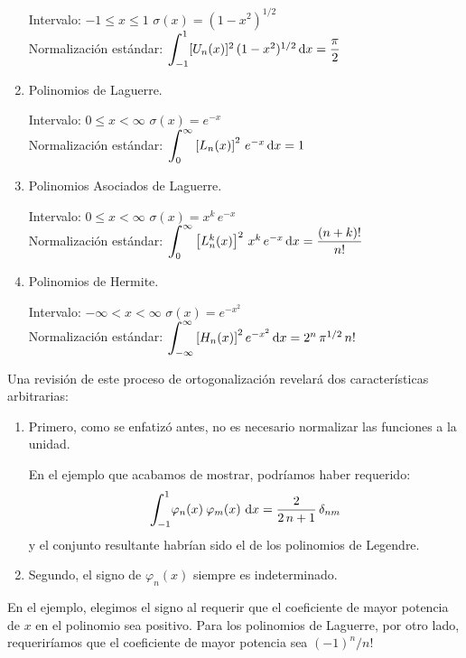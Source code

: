 \documentclass[12pt]{article}
\def\scaleint#1{\vcenter{\hbox{\scaleto[3ex]{\displaystyle\int}{#1}}}}
\def\bs{\mkern-12mu}
\numberwithin{equation}{section}
\begin{document}
\begin{enumerate}
\begin{center}
Intervalo: $-1 \leq x \leq 1$ \hspace{1.5cm} $\sigma (x) = (1 - x^{2})^{1/2}$ \\[1em]
Normalización estándar: $\scaleint{6ex}_{\bs -1}^{1} [U_{n} (x)]^{2} \, (1 - x^{2})^{1/2} \, \dd x = \dfrac{\pi}{2}$
\end{center}
\item Polinomios de Laguerre.

\begin{center}
Intervalo: $0 \leq x < \infty $ \hspace{1.5cm} $\sigma (x) = e^{-x}$ \\[1em]
Normalización estándar: $ \scaleint{6ex}_{\bs 0}^{\infty} \left[ L_{n} (x) \right]^{2} \, e^{-x} \dd{x} =  1 $
\end{center}
\item Polinomios Asociados de Laguerre.

\begin{center}
Intervalo: $0 \leq x < \infty $ \hspace{1.5cm} $\sigma (x) = x^{k} \, e^{-x}$ \\[1em]
Normalización estándar: $\scaleint{6ex}_{\bs 0}^{\infty} \left[ L_{n}^{k} (x) \right]^{2} \, x^{k} \, e^{-x} \dd{x} = \dfrac{(n + k)!}{n!}$
\end{center}
\item Polinomios de Hermite.

\begin{center}
Intervalo: $- \infty < x < \infty$ \hspace{1.5cm} $\sigma (x) =  e^{-x^{2}}$ \\[1em]
Normalización estándar: $\scaleint{6ex}_{\bs -\infty}^{\infty} \left[ H_{n} (x) \right]^{2} e^{-x^{2}} \dd{x} = 2^{n} \, \pi^{1/2} \, n!$
\end{center}
\end{enumerate}

Una revisión de este proceso de ortogonalización revelará dos características arbitrarias:
\begin{enumerate}
\item Primero, como se enfatizó antes, no es necesario normalizar las funciones a la unidad. 

En el ejemplo que acabamos de mostrar, podríamos haber requerido:
\begin{align}
\scaleint{6ex}_{\bs -1}^{1} \varphi_{n} (x) \: \varphi_{m} (x) \, \dd{x} = \dfrac{2}{2 \, n + 1} \, \delta_{nm}
\label{eq:ecuacion_10_61}
\end{align}
y el conjunto resultante habrían sido el de los polinomios de Legendre.
\item Segundo, el signo de $\varphi_{n} (x)$ siempre es indeterminado.
\end{enumerate}
En el ejemplo, elegimos el signo al requerir que el coeficiente de mayor potencia de $x$ en el polinomio sea positivo.  Para los polinomios de Laguerre, por otro lado, requeriríamos que el coeficiente de mayor potencia sea $(-1)^{n}/n!$
\end{document}
